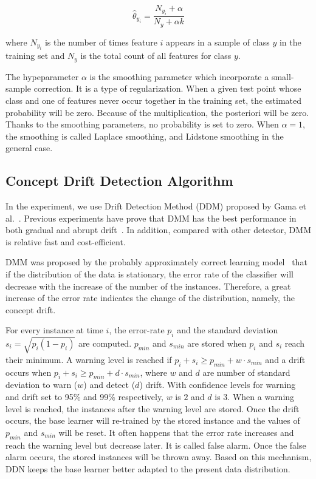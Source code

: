 \begin{equation}
\hat{\theta}_{y_i} = \frac{N_{y_i} + \alpha}{N_y+\alpha k}
\end{equation}

where $N_{y_i}$ is the number of times feature $i$ appears in a sample of class $y$ in the training set and $N_y$ is the total count of all features for class $y$.

The hypeparameter $\alpha$ is the smoothing parameter which incorporate a small-sample correction. It is a type of regularization. When a given test point whose class and one of features never occur together in the training set, the estimated probability will be zero. Because of the multiplication, the posteriori will be zero. Thanks to the smoothing parameters, no probability is set to zero. When $\alpha=1$, the smoothing is called Laplace smoothing, and Lidstone smoothing in the general case.

\subsection{Concept Drift Detection Algorithm}

In the experiment, we use Drift Detection Method (DDM) proposed by Gama et al.~\cite{gama2004learning}. Previous experiments have prove that DMM has the best performance in both gradual and abrupt drift~\cite{Goncalves2014}. In addition, compared with other detector, DMM is relative fast and cost-efficient. 

DMM was proposed by the probably approximately correct learning model~\cite{michalski2013machine} that if the distribution of the data is stationary, the error rate of the classifier will decrease with the increase of the number of the instances. Therefore, a great increase of the error rate indicates the change of the distribution, namely, the concept drift. 

For every instance at time $i$, the error-rate $p_i$ and the standard deviation $s_i = \sqrt{p_i(1-p_i)}$ are computed. $p_{min}$ and $s_{min}$ are stored when $p_i$ and $s_i$ reach their minimum. A warning level is reached if $p_i + s_i \geq p_{min} + w \cdot s_{min} $ and a drift occurs when $p_i + s_i \geq p_{min} +d \cdot s_{min}$, where $w$ and $d$ are number of standard deviation to warn ($w$) and detect ($d$) drift. With confidence levels for warning and drift set to 95\% and 99\% respectively, $w$ is $2$ and $d$ is $3$. When a warning level is reached, the instances after the warning level are stored. Once the drift occurs, the base learner will re-trained by the stored instance and the values of $p_{min}$ and $s_{min}$ will be reset. It often happens that the error rate increases and reach the warning level but decrease later. It is called false alarm. Once the false alarm occurs, the stored instances will be thrown away. Based on this mechanism, DDN keeps the base learner better adapted to the present data distribution.


